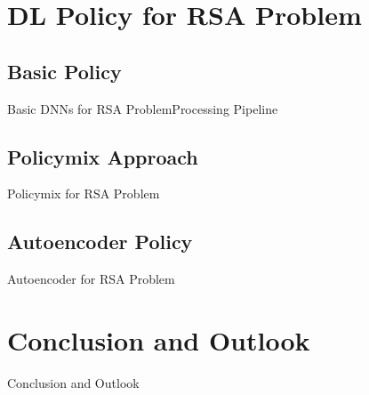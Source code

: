 \documentclass[english,aspectratio=169,dvipsnames]{beamer}
\begin{document}
\section{DL Policy for RSA Problem}

\subsection{Basic Policy}

\begin{frame}{Basic DNNs for RSA Problem}{Processing Pipeline}
	
\end{frame}


\subsection{Policymix Approach}

\begin{frame}{Policymix for RSA Problem}{}
	
\end{frame}


\subsection{Autoencoder Policy}

\begin{frame}{Autoencoder for RSA Problem}{}
	 
\end{frame}



\section{Conclusion and Outlook}

\begin{frame}{Conclusion and Outlook}{}
	 
\end{frame}
\end{document}
